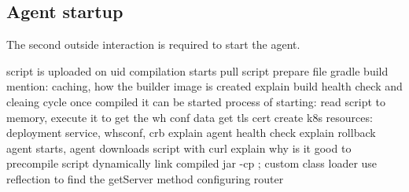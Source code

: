 \subsection{Agent startup}

The second outside interaction is required to start the agent.

script is uploaded on uid
compilation starts
    pull script
    prepare file
    gradle build
    mention: caching, how the builder image is created
    explain build health check and cleaing cycle
once compiled it can be started
process of starting:    
    read script to memory, execute it to get the wh conf data
    get tls cert
    create k8s resources: deployment service, whsconf, crb
    explain agent health check
    explain rollback
agent starts, agent downloads script with curl
    explain why is it good to precompile script
    dynamically link compiled jar -cp ; custom class loader
    use reflection to find the getServer method
    configuring router

